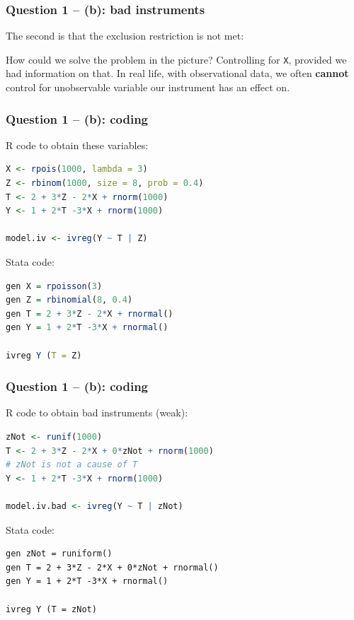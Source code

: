 \documentclass[xcolor=table,dvipsnames]{beamer}
\begin{document}
\begin{frame}
\frametitle{Question 1 -- (b): bad instruments}
The second is that the exclusion restriction is not met: \pause
{}  \pause

How could we solve the problem in the picture? \pause Controlling for \texttt{X}, provided we had information on that. \pause In real life, with observational data, we often \textbf{cannot} control for unobservable variable our instrument has an effect on.
\end{frame}

\begin{frame}[fragile]
\frametitle{Question 1 -- (b): coding}
R code to obtain these variables:
\begin{lstlisting}[language=R]
X <- rpois(1000, lambda = 3)
Z <- rbinom(1000, size = 8, prob = 0.4)
T <- 2 + 3*Z - 2*X + rnorm(1000)
Y <- 1 + 2*T -3*X + rnorm(1000)

model.iv <- ivreg(Y ~ T | Z)
\end{lstlisting}

Stata code:
\begin{lstlisting}[language=R]
gen X = rpoisson(3)
gen Z = rbinomial(8, 0.4)
gen T = 2 + 3*Z - 2*X + rnormal()
gen Y = 1 + 2*T -3*X + rnormal()

ivreg Y (T = Z)
\end{lstlisting}
\end{frame}

\begin{frame}[fragile]
\frametitle{Question 1 -- (b): coding}
R code to obtain bad instruments (weak):
\begin{lstlisting}[language=R]
zNot <- runif(1000)
T <- 2 + 3*Z - 2*X + 0*zNot + rnorm(1000) 
# zNot is not a cause of T
Y <- 1 + 2*T -3*X + rnorm(1000)

model.iv.bad <- ivreg(Y ~ T | zNot)
\end{lstlisting}

Stata code:
\begin{lstlisting}
gen zNot = runiform()
gen T = 2 + 3*Z - 2*X + 0*zNot + rnormal()
gen Y = 1 + 2*T -3*X + rnormal()

ivreg Y (T = zNot)
\end{lstlisting}
\end{frame}
\end{document}
